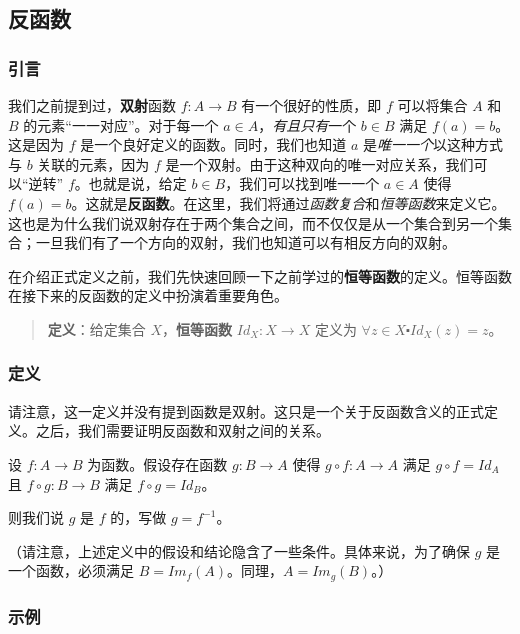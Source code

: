
\subsection{反函数}

\subsubsection*{引言}

我们之前提到过，\textbf{双射}函数 $f: A \to B$ 有一个很好的性质，即 $f$ 可以将集合 $A$ 和 $B$ 的元素``一一对应''。对于每一个 $a \in A$，\emph{有且只有}一个 $b \in B$ 满足 $f(a) = b$。这是因为 $f$ 是一个良好定义的函数。同时，我们也知道 $a$ 是\emph{唯一一个}以这种方式与 $b$ 关联的元素，因为 $f$ 是一个双射。由于这种双向的唯一对应关系，我们可以``逆转'' $f$。也就是说，给定 $b \in B$，我们可以找到唯一一个 $a \in A$ 使得 $f(a) = b$。这就是\textbf{反函数}。在这里，我们将通过\emph{函数复合}和\emph{恒等函数}来定义它。这也是为什么我们说双射存在于两个集合之间，而不仅仅是从一个集合到另一个集合；一旦我们有了一个方向的双射，我们也知道可以有相反方向的双射。

在介绍正式定义之前，我们先快速回顾一下之前学过的\textbf{恒等函数}的定义。恒等函数在接下来的反函数的定义中扮演着重要角色。
\begin{quotation}
    \textbf{定义}：给定集合 $X$，\textbf{恒等函数} $Id_X: X \to X$ 定义为 $\forall z \in X \centerdot Id_X(z) = z$。
\end{quotation}

\subsubsection*{定义}

请注意，这一定义并没有提到函数是双射。这只是一个关于反函数含义的正式定义。之后，我们需要证明反函数和双射之间的关系。

\begin{definition}
    设 $f:A \to B$ 为函数。假设存在函数 $g:B \to A$ 使得 $g \circ f : A \to A$ 满足 $g \circ f = Id_A$ 且 $f \circ g : B \to B$ 满足 $f \circ g = Id_B$。

    则我们说 $g$ 是 $f$ 的，写做 $g = f^{-1}$。
\end{definition}

（请注意，上述定义中的假设和结论隐含了一些条件。具体来说，为了确保 $g$ 是一个函数，必须满足 $B = Im_f (A)$。同理，$A = Im_g(B)$。）

\subsubsection*{示例}

